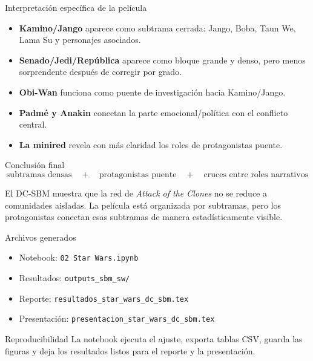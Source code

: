\documentclass[aspectratio=169,11pt]{beamer}
\begin{document}
\begin{frame}{Interpretación específica de la película}
\begin{itemize}
    \item \textbf{Kamino/Jango} aparece como subtrama cerrada: Jango, Boba, Taun We, Lama Su y personajes asociados.
    \item \textbf{Senado/Jedi/República} aparece como bloque grande y denso, pero menos sorprendente después de corregir por grado.
    \item \textbf{Obi-Wan} funciona como puente de investigación hacia Kamino/Jango.
    \item \textbf{Padmé y Anakin} conectan la parte emocional/política con el conflicto central.
    \item \textbf{La minired} revela con más claridad los roles de protagonistas puente.
\end{itemize}
\end{frame}

\begin{frame}{Conclusión final}
\centering
\Large
\[
\boxed{
\text{subtramas densas}
\quad+\quad
\text{protagonistas puente}
\quad+\quad
\text{cruces entre roles narrativos}
}
\]

\vspace{0.5cm}
\normalsize
El DC-SBM muestra que la red de \emph{Attack of the Clones} no se reduce a comunidades aisladas. La película está organizada por subtramas, pero los protagonistas conectan esas subtramas de manera estadísticamente visible.
\end{frame}

\begin{frame}{Archivos generados}
\begin{itemize}
    \item Notebook: \texttt{02 Star Wars.ipynb}
    \item Resultados: \texttt{outputs\_sbm\_sw/}
    \item Reporte: \texttt{resultados\_star\_wars\_dc\_sbm.tex}
    \item Presentación: \texttt{presentacion\_star\_wars\_dc\_sbm.tex}
\end{itemize}

\vspace{0.3cm}
\begin{block}{Reproducibilidad}
La notebook ejecuta el ajuste, exporta tablas CSV, guarda las figuras y deja los resultados listos para el reporte y la presentación.
\end{block}
\end{frame}
\end{document}
